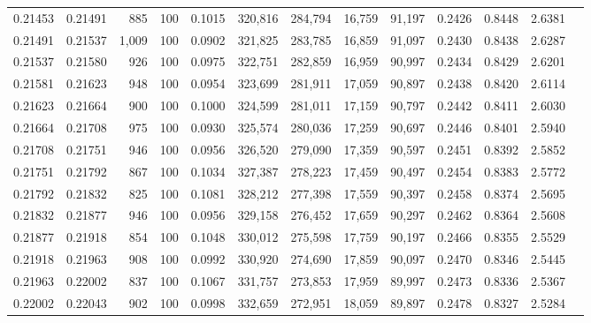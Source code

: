 \begin{tabular}{rrrrrrrrrrrrr}
0.21453 & 0.21491 &   885 & 100 &                                     0.1015 & 320,816 & 284,794 &  16,759 &  91,197 & 0.2426 & 0.8448 & 2.6381 \\
0.21491 & 0.21537 & 1,009 & 100 &                                     0.0902 & 321,825 & 283,785 &  16,859 &  91,097 & 0.2430 & 0.8438 & 2.6287 \\
0.21537 & 0.21580 &   926 & 100 &                                     0.0975 & 322,751 & 282,859 &  16,959 &  90,997 & 0.2434 & 0.8429 & 2.6201 \\
0.21581 & 0.21623 &   948 & 100 &                                     0.0954 & 323,699 & 281,911 &  17,059 &  90,897 & 0.2438 & 0.8420 & 2.6114 \\
0.21623 & 0.21664 &   900 & 100 &                                     0.1000 & 324,599 & 281,011 &  17,159 &  90,797 & 0.2442 & 0.8411 & 2.6030 \\
0.21664 & 0.21708 &   975 & 100 &                                     0.0930 & 325,574 & 280,036 &  17,259 &  90,697 & 0.2446 & 0.8401 & 2.5940 \\
0.21708 & 0.21751 &   946 & 100 &                                     0.0956 & 326,520 & 279,090 &  17,359 &  90,597 & 0.2451 & 0.8392 & 2.5852 \\
0.21751 & 0.21792 &   867 & 100 &                                     0.1034 & 327,387 & 278,223 &  17,459 &  90,497 & 0.2454 & 0.8383 & 2.5772 \\
0.21792 & 0.21832 &   825 & 100 &                                     0.1081 & 328,212 & 277,398 &  17,559 &  90,397 & 0.2458 & 0.8374 & 2.5695 \\
0.21832 & 0.21877 &   946 & 100 &                                     0.0956 & 329,158 & 276,452 &  17,659 &  90,297 & 0.2462 & 0.8364 & 2.5608 \\
0.21877 & 0.21918 &   854 & 100 &                                     0.1048 & 330,012 & 275,598 &  17,759 &  90,197 & 0.2466 & 0.8355 & 2.5529 \\
0.21918 & 0.21963 &   908 & 100 &                                     0.0992 & 330,920 & 274,690 &  17,859 &  90,097 & 0.2470 & 0.8346 & 2.5445 \\
0.21963 & 0.22002 &   837 & 100 &                                     0.1067 & 331,757 & 273,853 &  17,959 &  89,997 & 0.2473 & 0.8336 & 2.5367 \\
0.22002 & 0.22043 &   902 & 100 &                                     0.0998 & 332,659 & 272,951 &  18,059 &  89,897 & 0.2478 & 0.8327 & 2.5284 \\

\end{tabular}
